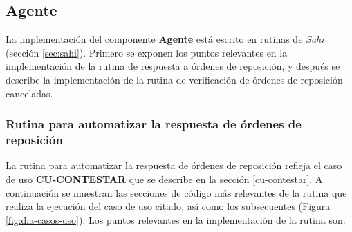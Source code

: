 \subsection{Agente}\label{sec:agente}
La implementación del componente \textbf{Agente} está escrito en rutinas de \textit{Sahi} (sección \ref{sec:sahi}). Primero se exponen los puntos relevantes en la implementación de la rutina de respuesta a órdenes de reposición, y después se describe la implementación de la rutina de verificación de órdenes de reposición canceladas.

\subsubsection{Rutina para automatizar la respuesta de órdenes de reposición}\label{sec:aut-contestar}
La rutina para automatizar la respuesta de órdenes de reposición refleja el caso de uso \textbf{CU-CONTESTAR} que se describe en la sección \ref{cu-contestar}. A continuación se muestran las secciones de código más relevantes de la rutina que realiza la ejecución del caso de uso citado, así como los subsecuentes (Figura \ref{fig:dia-casos-uso}). Los puntos relevantes en la implementación de la rutina son:

